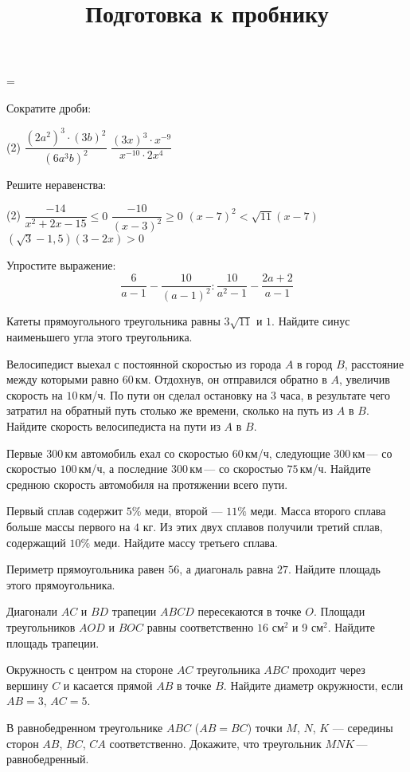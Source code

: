 =%
\begin{exam}
		\title{Подготовка к пробнику}
	\begin{listofex}
		\item Сократите дроби:
		\begin{tasks}(2)
			\task \( \dfrac{(2a^2)^3\cdot(3b)^2}{(6a^3b)^2} \)
			\task \( \dfrac{(3x)^3\cdot x^{-9}}{x^{-10}\cdot2x^4} \)
		\end{tasks}
		\item Решите неравенства:
		\begin{tasks}(2)
			\task \( \dfrac{-14}{x^2+2x-15}\le0 \)
			\task \( \dfrac{-10}{(x-3)^2}\ge0 \)
			\task \( (x-7)^2<\sqrt{11}(x-7) \)
			\task \( (\sqrt{3}-1,5)(3-2x)>0 \)
		\end{tasks}
		\item Упростите выражение:
		\[\dfrac{6}{a-1}-\dfrac{10}{(a-1)^2}:\dfrac{10}{a^2-1}-\dfrac{2a+2}{a-1}\]
		\item Катеты прямоугольного треугольника равны \( 3\sqrt{11} \) и \( 1 \). Найдите синус наименьшего угла этого треугольника.
		\item Велосипедист выехал с постоянной скоростью из города \( A \) в город \( B \), расстояние между которыми равно \( 60 \) км. Отдохнув, он отправился обратно в \( A \), увеличив скорость на \( 10 \) км/ч. По пути он сделал остановку на \( 3 \) часа, в результате чего затратил на обратный путь столько же времени, сколько на путь из \( A \) в \( B \). Найдите скорость велосипедиста на пути из \( A \) в \( B \).
		\item Первые \( 300 \) км автомобиль ехал со скоростью \( 60 \) км/ч, следующие \( 300 \) км --- со скоростью \( 100 \) км/ч, а последние \( 300 \) км --- со скоростью \( 75 \) км/ч. Найдите среднюю скорость автомобиля на протяжении всего пути.
		\item Первый сплав содержит \( 5\% \) меди, второй --- \( 11\% \) меди. Масса второго сплава больше массы первого на \( 4 \) кг. Из этих двух сплавов получили третий сплав, содержащий \( 10\% \) меди. Найдите массу третьего сплава.
		\item Периметр прямоугольника равен \( 56 \), а диагональ равна \( 27 \). Найдите площадь этого прямоугольника.
		\item Диагонали \( AC \) и \( BD \) трапеции \( ABCD \) пересекаются в точке \( O \). Площади треугольников \( AOD \) и \( BOC \) равны соответственно \( 16 \) см\( ^2 \)  и 9 см\( ^2 \). Найдите площадь трапеции.
		\item Окружность с центром на стороне \( AC \) треугольника \( ABC \) проходит через вершину \( C \) и касается прямой \( AB \) в точке \( B \). Найдите диаметр окружности, если \( AB=3 \), \( AC=5 \).
		\item В равнобедренном треугольнике \( ABC \) (\( AB=BC \)) точки \( M \), \( N \), \( K \) --- середины сторон \( AB \), \( BC \), \( CA \) соответственно. Докажите, что треугольник \( MNK \) --- равнобедренный.
	\end{listofex}
\end{exam}
